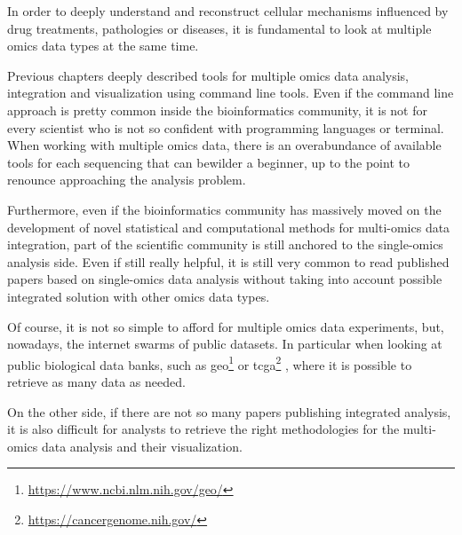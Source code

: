In order to deeply understand and reconstruct cellular mechanisms influenced by drug treatments, pathologies or diseases, it is fundamental to look at multiple omics data types at the same time.

Previous chapters deeply described tools for multiple omics data analysis, integration and visualization using command line tools.
Even if the command line approach is pretty common inside the bioinformatics community, it is not for every scientist who is not so confident with programming languages or terminal.
When working with multiple omics data, there is an overabundance of available tools for each sequencing that can bewilder a beginner, up to the point to renounce approaching the analysis problem.


Furthermore, even if the bioinformatics community has massively moved on the development of novel statistical and computational methods for multi-omics data integration, part of the scientific community is still anchored to the single-omics analysis side.
Even if still really helpful, it is still very common to read published papers based on single-omics data analysis without taking into account possible integrated solution with other omics data types.

Of course, it is not so simple to afford for multiple omics data experiments, but, nowadays, the internet swarms of public datasets.
In particular when looking at public biological data banks, such as \gls{geo}\footnote{\url{https://www.ncbi.nlm.nih.gov/geo/}} \cite{Services2007} or \gls{tcga}\footnote{\url{https://cancergenome.nih.gov/}} \cite{tcga2013a}, where it is possible to retrieve as many data as needed.

On the other side, if there are not so many papers publishing integrated analysis, it is also difficult for analysts to retrieve the right methodologies for the multi-omics data analysis and their visualization. 

